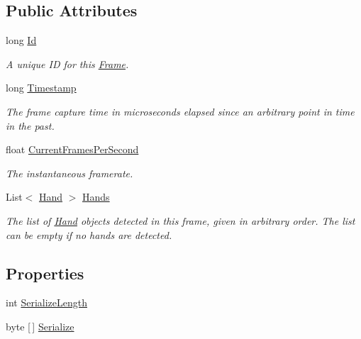 \subsection*{Public Attributes}
\begin{DoxyCompactItemize}
\item 
long \mbox{\hyperlink{class_leap_1_1_frame_a0a62a29a5e3e07c16f6f5c2cb52d5e84}{Id}}
\begin{DoxyCompactList}\small\item\em A unique ID for this \mbox{\hyperlink{class_leap_1_1_frame}{Frame}}. \end{DoxyCompactList}\item 
long \mbox{\hyperlink{class_leap_1_1_frame_a1e1b235fcb1f454ee20aa82c5342c987}{Timestamp}}
\begin{DoxyCompactList}\small\item\em The frame capture time in microseconds elapsed since an arbitrary point in time in the past. \end{DoxyCompactList}\item 
float \mbox{\hyperlink{class_leap_1_1_frame_acf9127d430f61dc4ed2dfae8674c3a30}{Current\+Frames\+Per\+Second}}
\begin{DoxyCompactList}\small\item\em The instantaneous framerate. \end{DoxyCompactList}\item 
List$<$ \mbox{\hyperlink{class_leap_1_1_hand}{Hand}} $>$ \mbox{\hyperlink{class_leap_1_1_frame_af0281471fb3831307b40a1124565d069}{Hands}}
\begin{DoxyCompactList}\small\item\em The list of \mbox{\hyperlink{class_leap_1_1_hand}{Hand}} objects detected in this frame, given in arbitrary order. The list can be empty if no hands are detected. \end{DoxyCompactList}\end{DoxyCompactItemize}
\subsection*{Properties}
\begin{DoxyCompactItemize}
\item 
int \mbox{\hyperlink{class_leap_1_1_frame_a91aa5f4c3fd9d1c649a4f4333d09cf43}{Serialize\+Length}}
\item 
byte \mbox{[}$\,$\mbox{]} \mbox{\hyperlink{class_leap_1_1_frame_a4c3654c5bf0c7d376502763d98cf9ca6}{Serialize}}
\end{DoxyCompactItemize}


